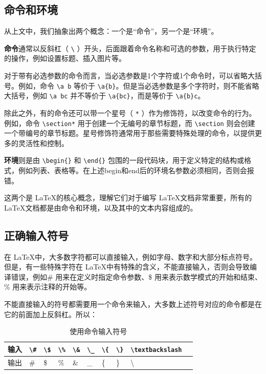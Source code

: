 \subsection{命令和环境}

从上文中，我们抽象出两个概念：一个是“命令”，另一个是“环境”。

\textbf{命令}通常以反斜杠（ \verb|\| ）开头，后面跟着命令名称和可选的参数，用于执行特定的操作，例如设置标题、插入图片等。

对于带有必选参数的命令而言，当必选参数是1个字符或1个命令时，可以省略大括号。例如，命令 \verb|\a b| 等价于 \verb|\a{b}|。但是当必选参数是多个字符时，则不能省略大括号，例如 \verb|\a bc| 并不等价于 \verb|\a{bc}|，而是等价于 \verb|\a{b}c|。

除此之外，有的命令还可以带一个星号（ \verb|*| ）作为修饰符，以改变命令的行为。例如，命令 \verb|\section*| 用于创建一个无编号的章节标题，而 \verb|\section| 则会创建一个带编号的章节标题。星号修饰符通常用于那些需要特殊处理的命令，以提供更多的灵活性和控制。

\textbf{环境}则是由 \verb|\begin{}| 和 \verb|\end{}| 包围的一段代码块，用于定义特定的结构或格式，例如列表、表格等。在上述begin和end后的环境名参数必须相同，否则会报错。

这两个是 \LaTeX 的核心概念，理解它们对于编写 \LaTeX 文档非常重要，所有的 \LaTeX 文档都是由命令和环境，以及其中的文本内容组成的。

\subsection{正确输入符号}

在 \LaTeX 中，大多数字符都可以直接输入，例如字母、数字和大部分标点符号。但是，有一些特殊字符在 \LaTeX 中有特殊的含义，不能直接输入，否则会导致编译错误，例如\# 用来在定义时指定命令参数、\$ 用来表示数学模式的开始和结束、\% 用来表示注释的开始等。

不能直接输入的符号都需要用一个命令来输入，大多数上述符号对应的命令都是在它的前面加上反斜杠。所以：
\begin{table}[htbp]
  \caption{使用命令输入符号}
  \centering
  \begin{tabular}{l|lllllllll}
    \toprule
    输入 & \verb|\#| & \verb|\$| & \verb|\%| & \verb|\&| & \verb|\_| & \verb|\{| & \verb|\}| & \verb|\textbackslash| \\
    \midrule
    输出 & \# & \$ & \% & \& & \_ & \{ & \} & \textbackslash \\
    \bottomrule
  \end{tabular}
\end{table}


